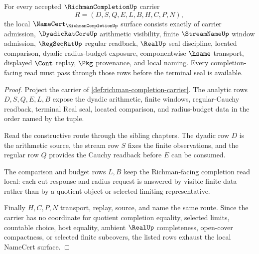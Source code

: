 \begin{theorem}
\label{thm:richman-completion-namecert-obligations}
For every accepted $\RichmanCompletionUp$ carrier
$$
R=(D,S,Q,E,L,B,H,C,P,N),
$$
the local $\NameCert_{\RichmanCompletionUp}$ surface consists exactly of carrier admission, $\DyadicRatCoreUp$ arithmetic visibility, finite $\StreamNameUp$ window admission, $\RegSeqRatUp$ regular readback, $\RealUp$ seal discipline, located comparison, dyadic radius-budget exposure, componentwise $\hsame$ transport, displayed $\Cont$ replay, $\Pkg$ provenance, and local naming. Every completion-facing read must pass through those rows before the terminal seal is available.
\end{theorem}
\begin{proof}
Project the carrier of \autoref{def:richman-completion-carrier}. The analytic rows $D,S,Q,E,L,B$ expose the dyadic arithmetic, finite windows, regular-Cauchy readback, terminal Real seal, located comparison, and radius-budget data in the order named by the tuple.

Read the constructive route through the sibling chapters. The dyadic row $D$ is the arithmetic source, the stream row $S$ fixes the finite observations, and the regular row $Q$ provides the Cauchy readback before $E$ can be consumed.

The comparison and budget rows $L,B$ keep the Richman-facing completion read local: each cut response and radius request is answered by visible finite data rather than by a quotient object or selected limiting representative.

Finally $H,C,P,N$ transport, replay, source, and name the same route. Since the carrier has no coordinate for quotient completion equality, selected limits, countable choice, host equality, ambient $\RealUp$ completeness, open-cover compactness, or selected finite subcovers, the listed rows exhaust the local NameCert surface.
\end{proof}

